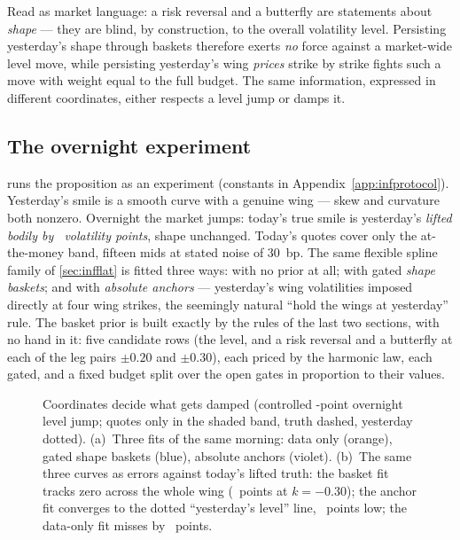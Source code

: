 Read as market language: a risk reversal and a butterfly are
statements about \emph{shape} --- they are blind, by construction, to
the overall volatility level.  Persisting yesterday's shape through
baskets therefore exerts \emph{no} force against a market-wide level
move, while persisting yesterday's wing \emph{prices} strike by
strike fights such a move with weight equal to the full budget.  The
same information, expressed in different coordinates, either
respects a level jump or damps it.

\subsection{The overnight experiment}

 runs the proposition as an experiment
(constants in Appendix~\ref{app:infprotocol}).  Yesterday's smile is
a smooth curve with a genuine wing --- skew and curvature both
nonzero.  Overnight the market jumps: today's true smile is
yesterday's \emph{lifted bodily by \MacPriorJumpPts\ volatility
points}, shape unchanged.  Today's quotes cover only the
at-the-money band, fifteen mids at stated noise of 30~bp.  The same
flexible spline family of \cref{sec:infflat} is fitted three ways:
with no prior at all; with gated \emph{shape baskets}; and with
\emph{absolute anchors} --- yesterday's wing volatilities imposed
directly at four wing strikes, the seemingly natural ``hold the
wings at yesterday'' rule.  The basket prior is built exactly by the
rules of the last two sections, with no hand in it: five candidate
rows (the level, and a risk reversal and a butterfly at each of the
leg pairs $\pm0.20$ and $\pm0.30$), each priced by the harmonic law,
each gated, and a fixed budget split over the open gates in
proportion to their values.

\begin{figure}[htbp]
\centering
{}
\caption{Coordinates decide what gets damped (controlled
\MacPriorJumpPts-point overnight level jump; quotes only in the
shaded band, truth dashed, yesterday dotted).  (a)~Three fits of the
same morning: data only (orange), gated shape baskets (blue),
absolute anchors (violet).  (b)~The same three curves as errors
against today's lifted truth: the basket fit tracks zero across the
whole wing (\MacPriorJumpBasketErrDeep\ points at $k=-0.30$); the
anchor fit converges to the dotted ``yesterday's level'' line,
\MacPriorJumpAnchorErrDeep\ points low; the data-only fit
misses by \MacPriorJumpDataErrDeep\ points.}
\label{fig:infjump}
\end{figure}

